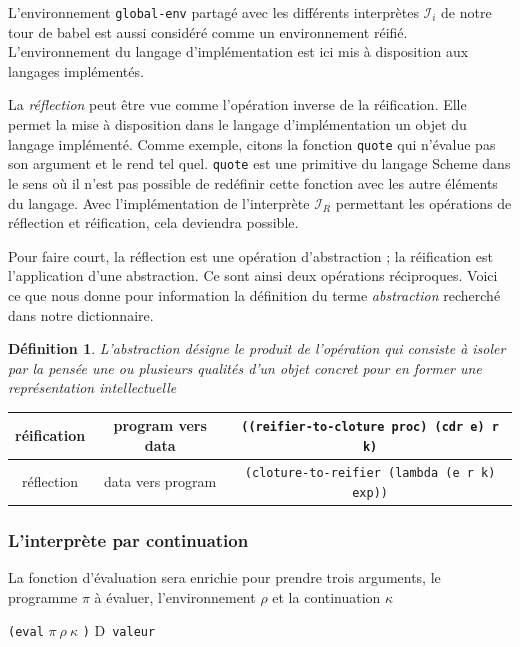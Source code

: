 \documentclass[11pt]{book}
\newcommand{\imp}{{\letterimp D}\hspace{0.1cm}}
\newtheorem{definition}{Définition}
\begin{document}
L'environnement \verb+global-env+ partagé avec les différents interprètes $\mathcal{I}_i$ de notre tour de babel est aussi considéré
comme un environnement réifié. L'environnement du langage d'implémentation est ici mis à disposition aux langages implémentés.


La \textit{réflection} peut être vue comme l'opération inverse de la réification.
Elle permet la mise à disposition dans le langage d'implémentation un objet du langage implémenté.
Comme exemple, citons la fonction \verb+quote+ qui n'évalue pas son argument et le rend tel quel. \verb+quote+ est
 une primitive du langage Scheme dans le 
sens où il n'est pas possible  de redéfinir cette fonction avec les autre éléments du langage.
Avec l'implémentation de l'interprète $\mathcal{I}_R$ permettant les opérations de réflection et réification,
 cela deviendra possible. 

Pour faire court, la réflection est une opération d'abstraction ; la réification est l'application d'une abstraction.
Ce sont ainsi deux opérations réciproques. 
Voici ce que nous donne pour information la définition du terme \textit{abstraction} recherché dans notre dictionnaire.
\begin{definition}
  L'abstraction désigne le produit de l'opération qui consiste à isoler par la pensée une ou plusieurs qualités d'un objet
  concret pour en former une représentation intellectuelle
    
\end{definition} 

\vspace{0.5cm}

\begin{tabular}{c|c|c} \hline
réification & program vers data &  \verb+((reifier-to-cloture proc) (cdr e) r k)+   \\ \hline
réflection  & data vers program & \verb+(cloture-to-reifier (lambda (e r k) exp))+ \\ \hline
\end{tabular}


\subsubsection{L'interprète par continuation }
La fonction d'évaluation sera enrichie pour prendre trois arguments, le programme $\pi$ à évaluer, l'environnement 
$\rho$ et la continuation $\kappa$ 
\begin{center}
\verb+(eval+ $\pi\ \rho\ \kappa$ \verb+)+ \imp\  \verb+valeur+
\end{center}
\end{document}

